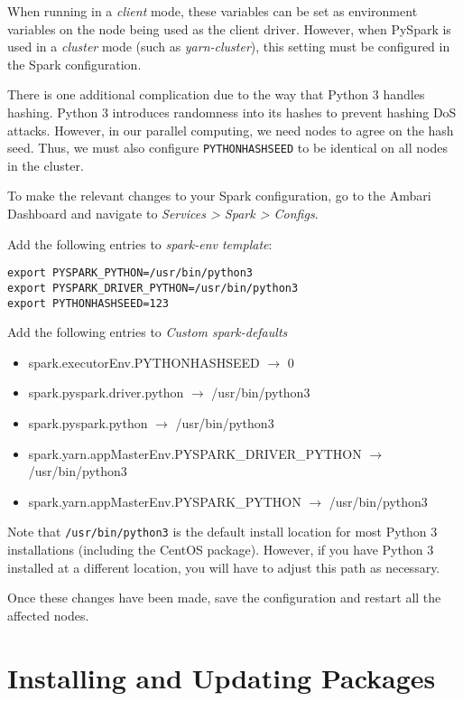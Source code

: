 \documentclass[9pt,twocolumn,twoside]{idsi}
\begin{document}
When running in a \emph{client} mode, these variables can be set as environment variables on the node being used as the client driver. However, when PySpark is used in a \emph{cluster} mode (such as \emph{yarn-cluster}), this setting must be configured in the Spark configuration.

There is one additional complication due to the way that Python 3 handles hashing. Python 3 introduces randomness into its hashes to prevent hashing DoS attacks. However, in our parallel computing, we need nodes to agree on the hash seed. Thus, we must also configure \texttt{PYTHONHASHSEED} to be identical on all nodes in the cluster.

To make the relevant changes to your Spark configuration, go to the Ambari Dashboard and navigate to \emph{Services > Spark > Configs}.

Add the following entries to \emph{spark-env template}:

\begin{lstlisting}
export PYSPARK_PYTHON=/usr/bin/python3
export PYSPARK_DRIVER_PYTHON=/usr/bin/python3
export PYTHONHASHSEED=123
\end{lstlisting}

Add the following entries to \emph{Custom spark-defaults}
\begin{itemize}
  \item spark.executorEnv.PYTHONHASHSEED $\rightarrow$ 0

  \item spark.pyspark.driver.python $\rightarrow$ /usr/bin/python3

  \item spark.pyspark.python $\rightarrow$ /usr/bin/python3

  \item spark.yarn.appMasterEnv.PYSPARK\_DRIVER\_PYTHON $\rightarrow$ /usr/bin/python3

  \item spark.yarn.appMasterEnv.PYSPARK\_PYTHON $\rightarrow$ /usr/bin/python3
\end{itemize}

Note that \texttt{/usr/bin/python3} is the default install location for most Python 3 installations (including the CentOS package). However, if you have Python 3 installed at a different location, you will have to adjust this path as necessary.

Once these changes have been made, save the configuration and restart all the affected nodes.

\section{Installing and Updating Packages}
\end{document}
